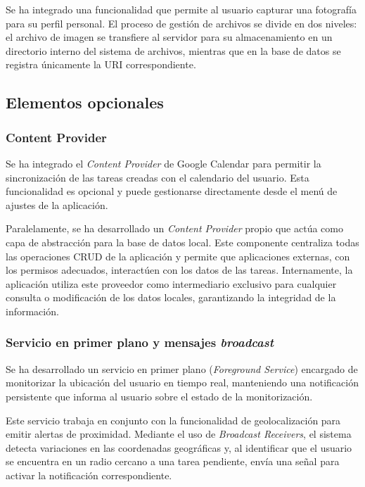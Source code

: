 \documentclass{article}
\begin{document}
Se ha integrado una funcionalidad que permite al usuario capturar una fotografía para su perfil personal. El proceso de gestión de archivos se divide en dos niveles: el archivo de imagen se transfiere al servidor para su almacenamiento en un directorio interno del sistema de archivos, mientras que en la base de datos se registra únicamente la URI correspondiente.

\subsection{Elementos opcionales}


\subsubsection{Content Provider}

Se ha integrado el \textit{Content Provider} de Google Calendar para permitir la sincronización de las tareas creadas con el calendario del usuario. Esta funcionalidad es opcional y puede gestionarse directamente desde el menú de ajustes de la aplicación.

Paralelamente, se ha desarrollado un \textit{Content Provider} propio que actúa como capa de abstracción para la base de datos local. Este componente centraliza todas las operaciones CRUD de la aplicación y permite que aplicaciones externas, con los permisos adecuados, interactúen con los datos de las tareas. Internamente, la aplicación utiliza este proveedor como intermediario exclusivo para cualquier consulta o modificación de los datos locales, garantizando la integridad de la información.

\subsubsection{Servicio en primer plano y mensajes \textit{broadcast}}

Se ha desarrollado un servicio en primer plano (\textit{Foreground Service}) encargado de monitorizar la ubicación del usuario en tiempo real, manteniendo una notificación persistente que informa al usuario sobre el estado de la monitorización.

Este servicio trabaja en conjunto con la funcionalidad de geolocalización para emitir alertas de proximidad. Mediante el uso de \textit{Broadcast Receivers}, el sistema detecta variaciones en las coordenadas geográficas y, al identificar que el usuario se encuentra en un radio cercano a una tarea pendiente, envía una señal para activar la notificación correspondiente.
\end{document}
